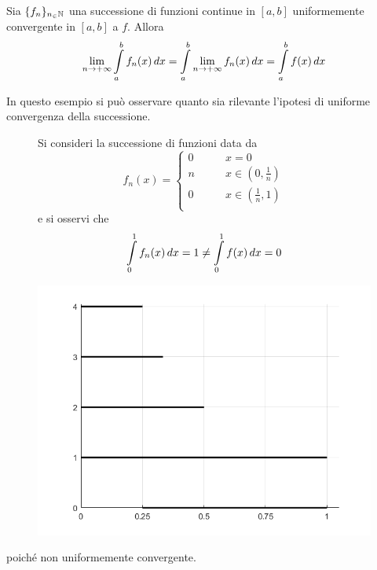 \begin{theorem} \label{Teo: Passaggio al limite sotto al segno di integrale}
Sia $\{f_n\}_{n_\in \mathbb{N}}$ una successione di funzioni continue in $[a,b]$ uniformemente convergente in $[a,b]$ a $f$. Allora
\begin{equation}
    \lim_{n \to +\infty}{\int\limits_{a}^{b}{f_n(x)}\,dx}=\int\limits_{a}^{b}{\lim_{n \to +\infty}{f_n(x)}\,dx}= \int\limits_{a}^{b}{f(x)}\,dx
\end{equation}
\end{theorem}
\begin{example}
    In questo esempio si può osservare quanto sia rilevante l'ipotesi di uniforme convergenza della successione.
    \begin{figure}[H]
        \centering
        \begin{minipage}{0.5\textwidth}
            Si consideri la successione di funzioni data da 
            \begin{equation*}
            f_n(x)=\begin{cases}
            0 &\qquad x=0\\
            n & \qquad x \in (0, \frac{1}{n})\\
            0 &\qquad x \in (\frac{1}{n}, 1)\\
            \end{cases}
            \end{equation*}
            e si osservi che
            \begin{equation*}
                \int\limits_{0}^{1}{f_n(x)}\,dx=1 \neq \int\limits_{0}^{1}{f(x)}\,dx = 0
            \end{equation*}
        \end{minipage}
        \begin{minipage}{0.4\textwidth}
        \includegraphics[width=\textwidth]{Capitoli/Capitolo7/Esempio integrale succ. funz..png}
        \end{minipage}
    \end{figure}
    poiché non uniformemente convergente.
\end{example}

